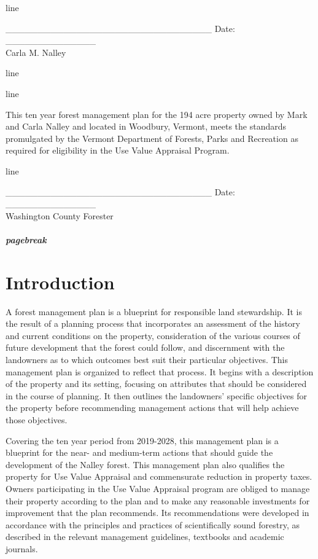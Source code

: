 \documentclass[]{tufte-handout}
\begin{document}
line

\_\_\_\_\_\_\_\_\_\_\_\_\_\_\_\_\_\_\_\_\_\_\_\_\_\_\_\_\_\_\_\_ Date:
\_\_\_\_\_\_\_\_\_\_\_\_\_\_\\
Carla M. Nalley

line

line

This ten year forest management plan for the 194 acre property owned by
Mark and Carla Nalley and located in Woodbury, Vermont, meets the
standards promulgated by the Vermont Department of Forests, Parks and
Recreation as required for eligibility in the Use Value Appraisal
Program.

line

\_\_\_\_\_\_\_\_\_\_\_\_\_\_\_\_\_\_\_\_\_\_\_\_\_\_\_\_\_\_\_\_ Date:
\_\_\_\_\_\_\_\_\_\_\_\_\_\_\\
Washington County Forester

\subparagraph{pagebreak}\label{pagebreak}

\section{Introduction}\label{introduction}

A forest management plan is a blueprint for responsible land
stewardship. It is the result of a planning process that incorporates an
assessment of the history and current conditions on the property,
consideration of the various courses of future development that the
forest could follow, and discernment with the landowners as to which
outcomes best suit their particular objectives. This management plan is
organized to reflect that process. It begins with a description of the
property and its setting, focusing on attributes that should be
considered in the course of planning. It then outlines the landowners'
specific objectives for the property before recommending management
actions that will help achieve those objectives.

Covering the ten year period from 2019-2028, this management plan is a
blueprint for the near- and medium-term actions that should guide the
development of the Nalley forest. This management plan also qualifies
the property for Use Value Appraisal and commensurate reduction in
property taxes. Owners participating in the Use Value Appraisal program
are obliged to manage their property according to the plan and to make
any reasonable investments for improvement that the plan recommends. Its
recommendations were developed in accordance with the principles and
practices of scientifically sound forestry, as described in the relevant
management guidelines, textbooks and academic journals.
\end{document}
